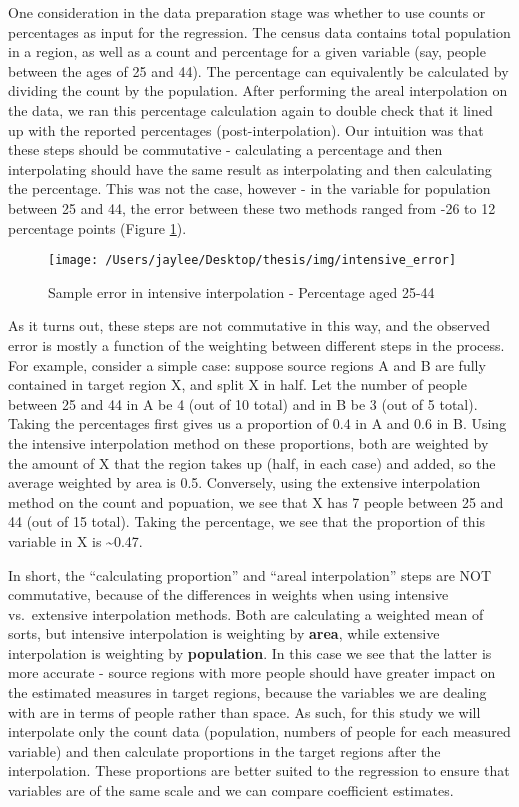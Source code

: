\documentclass[12pt,twoside]{reedthesis}
\begin{document}
One consideration in the data preparation stage was whether to use counts or percentages as input for the regression. The census data contains total population in a region, as well as a count and percentage for a given variable (say, people between the ages of 25 and 44). The percentage can equivalently be calculated by dividing the count by the population. After performing the areal interpolation on the data, we ran this percentage calculation again to double check that it lined up with the reported percentages (post-interpolation). Our intuition was that these steps should be commutative - calculating a percentage and then interpolating should have the same result as interpolating and then calculating the percentage. This was not the case, however - in the variable for population between 25 and 44, the error between these two methods ranged from -26 to 12 percentage points (Figure \ref{fig:interp-error}).
\begin{figure}
\texttt{[image: /Users/jaylee/Desktop/thesis/img/intensive\_error]} \caption{Sample error in intensive interpolation - Percentage aged 25-44}\label{fig:interp-error}
\end{figure}
As it turns out, these steps are not commutative in this way, and the observed error is mostly a function of the weighting between different steps in the process. For example, consider a simple case: suppose source regions A and B are fully contained in target region X, and split X in half. Let the number of people between 25 and 44 in A be 4 (out of 10 total) and in B be 3 (out of 5 total). Taking the percentages first gives us a proportion of 0.4 in A and 0.6 in B. Using the intensive interpolation method on these proportions, both are weighted by the amount of X that the region takes up (half, in each case) and added, so the average weighted by area is 0.5. Conversely, using the extensive interpolation method on the count and popuation, we see that X has 7 people between 25 and 44 (out of 15 total). Taking the percentage, we see that the proportion of this variable in X is \textasciitilde0.47.

In short, the ``calculating proportion'' and ``areal interpolation'' steps are NOT commutative, because of the differences in weights when using intensive vs.~extensive interpolation methods. Both are calculating a weighted mean of sorts, but intensive interpolation is weighting by \textbf{area}, while extensive interpolation is weighting by \textbf{population}. In this case we see that the latter is more accurate - source regions with more people should have greater impact on the estimated measures in target regions, because the variables we are dealing with are in terms of people rather than space. As such, for this study we will interpolate only the count data (population, numbers of people for each measured variable) and then calculate proportions in the target regions after the interpolation. These proportions are better suited to the regression to ensure that variables are of the same scale and we can compare coefficient estimates.
\end{document}
